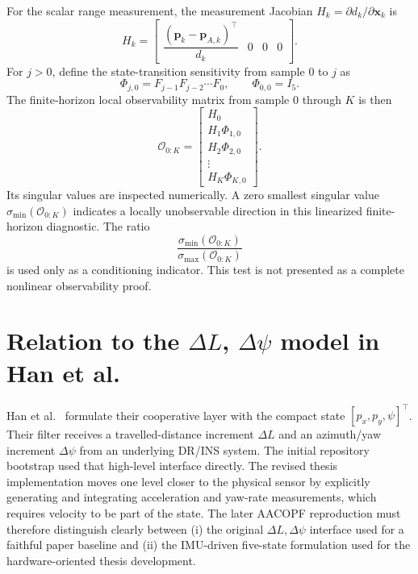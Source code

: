 For the scalar range measurement, the measurement Jacobian $H_k=\partial d_k/\partial\bm{x}_k$ is
\begin{equation}
H_k=
\begin{bmatrix}
\dfrac{(\bm{p}_k-\bm{p}_{A,k})^\top}{d_k} & 0 & 0 & 0
\end{bmatrix}.
\end{equation}
For $j>0$, define the state-transition sensitivity from sample $0$ to $j$ as
\begin{equation}
\Phi_{j,0}=F_{j-1}F_{j-2}\cdots F_0,
\qquad
\Phi_{0,0}=I_5.
\end{equation}
The finite-horizon local observability matrix from sample $0$ through $K$ is then
\begin{equation}
\mathcal{O}_{0:K}=
\begin{bmatrix}
H_0\\
H_1\Phi_{1,0}\\
H_2\Phi_{2,0}\\
\vdots\\
H_K\Phi_{K,0}
\end{bmatrix}.
\end{equation}
Its singular values are inspected numerically. A zero smallest singular value $\sigma_{\min}(\mathcal{O}_{0:K})$ indicates a locally unobservable direction in this linearized finite-horizon diagnostic. The ratio
\begin{equation}
\frac{\sigma_{\min}(\mathcal{O}_{0:K})}{\sigma_{\max}(\mathcal{O}_{0:K})}
\end{equation}
is used only as a conditioning indicator. This test is not presented as a complete nonlinear observability proof.

\section{Relation to the $\Delta L$, $\Delta\psi$ model in Han et al.}
Han et al.~\cite{han2020cooperative} formulate their cooperative layer with the compact state $[p_x,p_y,\psi]^\top$. Their filter receives a travelled-distance increment $\Delta L$ and an azimuth/yaw increment $\Delta\psi$ from an underlying DR/INS system. The initial repository bootstrap used that high-level interface directly. The revised thesis implementation moves one level closer to the physical sensor by explicitly generating and integrating acceleration and yaw-rate measurements, which requires velocity to be part of the state. The later AACOPF reproduction must therefore distinguish clearly between (i) the original $\Delta L,\Delta\psi$ interface used for a faithful paper baseline and (ii) the IMU-driven five-state formulation used for the hardware-oriented thesis development.
